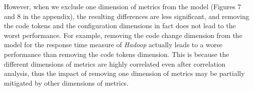 However, when we exclude one dimension of metrics from the model (Figures 7
and 8 %
in the appendix), the resulting differences %
are less significant, and removing the code tokens and the configuration dimensions in fact does not lead to the worst performance.
For example, removing the code change dimension from the model for the response time measure of \emph{Hadoop} actually leads to a worse performance than removing the code tokens dimension. 
This is because the different dimensions of metrics are highly correlated even after correlation analysis, %
thus the impact of removing one dimension of metrics may be partially mitigated by other dimensions of metrics.






